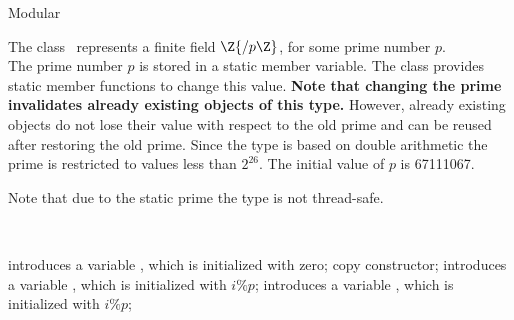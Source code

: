 \begin{ccRefClass} {Modular}
\label{Modular}

\def\ccTagOperatorLayout{\ccFalse}

\ccDefinition

The class \ccRefName\ represents a finite field $\Z{/p\Z}$, 
for some prime number $p$. \\

The prime number $p$ is stored in a static member variable. 
The class provides static member functions to change this value. 
{\bf Note that changing the prime invalidates already existing objects 
of this type.}
However, already existing objects do not lose their value with respect to the 
old prime and can be reused after restoring the old prime. 
Since the type is based on double 
arithmetic the prime is restricted to values less than $2^{26}$. 
The initial value of $p$ is 67111067. 

Note that due to the static prime the type is not thread-safe.


\ccIsModel
{}\\


\ccCreation
{}

{introduces a variable \ccVar, which is initialized with zero;}
\ccGlue
{}
{copy constructor;}
\ccGlue
{}
{introduces a variable \ccVar, which is initialized with $i \%  p$;}
\ccGlue
{}
{introduces a variable \ccVar, which is initialized with $i \%  p$;}

\ccOperations

\ccGlue
{}
\ccGlue
{}


\ccGlue
{}\ccGlue

\ccGlue
{}\ccGlue
{}\ccGlue
{}\ccGlue

\ccGlue
{}\ccGlue
{}\ccGlue
{}\ccGlue

\end{ccRefClass} 
